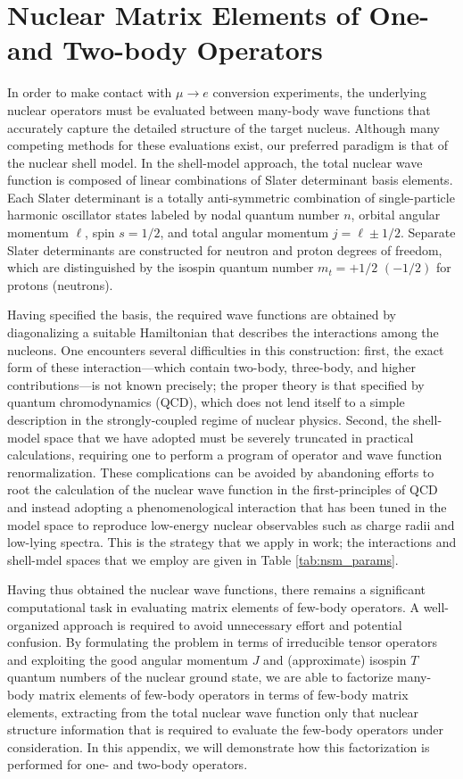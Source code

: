 \documentclass{book}[letterpaper,12pt]
\begin{document}
\chapter{Nuclear Matrix Elements of One- and Two-body Operators}
\thispagestyle{headings}
\label{app:density}
In order to make contact with $\mu\rightarrow e$ conversion experiments, the underlying nuclear operators must be evaluated between many-body wave functions that accurately capture the detailed structure of the target nucleus. Although many competing methods for these evaluations exist, our preferred paradigm is that of the nuclear shell model. In the shell-model approach, the total nuclear wave function is composed of linear combinations of Slater determinant basis elements. Each Slater determinant is a totally anti-symmetric combination of single-particle harmonic oscillator states labeled by nodal quantum number $n$, orbital angular momentum $\ell$, spin $s=1/2$, and total angular momentum $j=\ell\pm 1/2$. Separate Slater determinants are constructed for neutron and proton degrees of freedom, which are distinguished by the isospin quantum number $m_t=+1/2$ $(-1/2)$ for protons (neutrons). 

Having specified the basis, the required wave functions are obtained by diagonalizing a suitable Hamiltonian that describes the interactions among the nucleons. One encounters several difficulties in this construction: first, the exact form of these interaction---which contain two-body, three-body, and higher contributions---is not known precisely; the proper theory is that specified by quantum chromodynamics (QCD), which does not lend itself to a simple description in the strongly-coupled regime of nuclear physics. Second, the shell-model space that we have adopted must be severely truncated in practical calculations, requiring one to perform a program of operator and wave function renormalization. These complications can be avoided by abandoning efforts to root the calculation of the nuclear wave function in the first-principles of QCD and instead adopting a phenomenological interaction that has been tuned in the model space to reproduce low-energy nuclear observables such as charge radii and low-lying spectra. This is the strategy that we apply in work; the interactions and shell-mdel spaces that we employ are given in Table \ref{tab:nsm_params}. 

Having thus obtained the nuclear wave functions, there remains a significant computational task in evaluating matrix elements of few-body operators. A well-organized approach is required to avoid unnecessary effort and potential confusion. By formulating the problem in terms of irreducible tensor operators and exploiting the good angular momentum $J$ and (approximate) isospin $T$ quantum numbers of the nuclear ground state, we are able to factorize many-body matrix elements of few-body operators in terms of few-body matrix elements, extracting from the total nuclear wave function only that nuclear structure information that is required to evaluate the few-body operators under consideration. In this appendix, we will demonstrate how this factorization is performed for one- and two-body operators.
\end{document}
